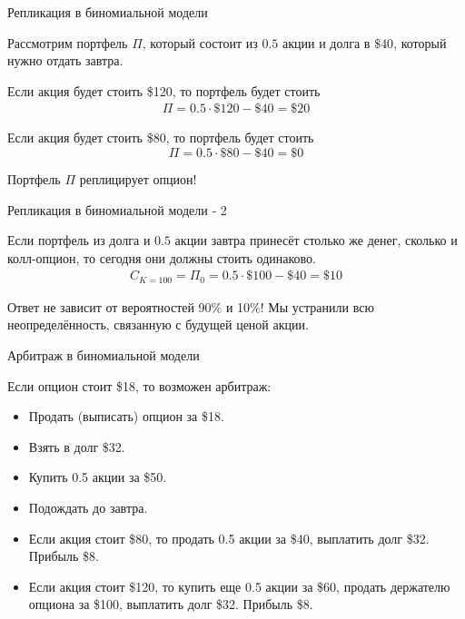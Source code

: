 \documentclass{beamer}
\begin{document}
\begin{frame}{Репликация в биномиальной модели}
\centering
{}

\justify
Рассмотрим портфель $\Pi$, который состоит из $0.5$ акции и долга в $\$40$, который нужно отдать завтра.

\justify
Если акция будет стоить \$120, то портфель будет стоить
\begin{align*}\Pi = 0.5\cdot\$120 - \$40 = \$20\end{align*}

\justify
Если акция будет стоить \$80, то портфель будет стоить
$$\Pi = 0.5 \cdot \$80 - \$40 = \$0$$

\justify
Портфель $\Pi$ \alert{реплицирует} опцион!
\end{frame}



\begin{frame}{Репликация в биномиальной модели - 2}
\centering
{}


\justify
Если портфель из долга и $0.5$ акции \alert{завтра} принесёт столько же денег, сколько и колл-опцион, то \alert{сегодня} они должны стоить одинаково.
\begin{align*}
C_{K=100} = \Pi_0 = 0.5 \cdot \$100 - \$40 = \$10
\end{align*}

Ответ не зависит от вероятностей 90\% и 10\%! Мы устранили всю неопределённость, связанную с будущей ценой акции.
\end{frame}



\begin{frame}{Арбитраж в биномиальной модели}
\centering
{}

\justify
Если опцион стоит \$18, то возможен арбитраж:
\begin{itemize}
\item Продать (выписать) опцион за \$18.
\item Взять в долг \$32.
\item Купить 0.5 акции за \$50.
\item Подождать до завтра.
\item Если акция стоит \$80, то продать 0.5 акции за \$40, выплатить долг \$32. Прибыль \$8.
\item Если акция стоит \$120, то купить еще 0.5 акции за \$60, продать держателю опциона за \$100, выплатить долг \$32. Прибыль \$8.
\end{itemize}
\end{frame}
\end{document}
